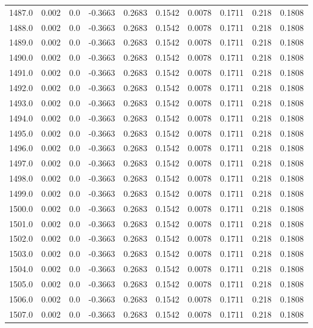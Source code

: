 \begin{longtable}{lrrrrrrrrr}
1487.0 & 0.002 & 0.0 & -0.3663 & 0.2683 & 0.1542 & 0.0078 & 0.1711 & 0.218 & 0.1808 \\
1488.0 & 0.002 & 0.0 & -0.3663 & 0.2683 & 0.1542 & 0.0078 & 0.1711 & 0.218 & 0.1808 \\
1489.0 & 0.002 & 0.0 & -0.3663 & 0.2683 & 0.1542 & 0.0078 & 0.1711 & 0.218 & 0.1808 \\
1490.0 & 0.002 & 0.0 & -0.3663 & 0.2683 & 0.1542 & 0.0078 & 0.1711 & 0.218 & 0.1808 \\
1491.0 & 0.002 & 0.0 & -0.3663 & 0.2683 & 0.1542 & 0.0078 & 0.1711 & 0.218 & 0.1808 \\
1492.0 & 0.002 & 0.0 & -0.3663 & 0.2683 & 0.1542 & 0.0078 & 0.1711 & 0.218 & 0.1808 \\
1493.0 & 0.002 & 0.0 & -0.3663 & 0.2683 & 0.1542 & 0.0078 & 0.1711 & 0.218 & 0.1808 \\
1494.0 & 0.002 & 0.0 & -0.3663 & 0.2683 & 0.1542 & 0.0078 & 0.1711 & 0.218 & 0.1808 \\
1495.0 & 0.002 & 0.0 & -0.3663 & 0.2683 & 0.1542 & 0.0078 & 0.1711 & 0.218 & 0.1808 \\
1496.0 & 0.002 & 0.0 & -0.3663 & 0.2683 & 0.1542 & 0.0078 & 0.1711 & 0.218 & 0.1808 \\
1497.0 & 0.002 & 0.0 & -0.3663 & 0.2683 & 0.1542 & 0.0078 & 0.1711 & 0.218 & 0.1808 \\
1498.0 & 0.002 & 0.0 & -0.3663 & 0.2683 & 0.1542 & 0.0078 & 0.1711 & 0.218 & 0.1808 \\
1499.0 & 0.002 & 0.0 & -0.3663 & 0.2683 & 0.1542 & 0.0078 & 0.1711 & 0.218 & 0.1808 \\
1500.0 & 0.002 & 0.0 & -0.3663 & 0.2683 & 0.1542 & 0.0078 & 0.1711 & 0.218 & 0.1808 \\
1501.0 & 0.002 & 0.0 & -0.3663 & 0.2683 & 0.1542 & 0.0078 & 0.1711 & 0.218 & 0.1808 \\
1502.0 & 0.002 & 0.0 & -0.3663 & 0.2683 & 0.1542 & 0.0078 & 0.1711 & 0.218 & 0.1808 \\
1503.0 & 0.002 & 0.0 & -0.3663 & 0.2683 & 0.1542 & 0.0078 & 0.1711 & 0.218 & 0.1808 \\
1504.0 & 0.002 & 0.0 & -0.3663 & 0.2683 & 0.1542 & 0.0078 & 0.1711 & 0.218 & 0.1808 \\
1505.0 & 0.002 & 0.0 & -0.3663 & 0.2683 & 0.1542 & 0.0078 & 0.1711 & 0.218 & 0.1808 \\
1506.0 & 0.002 & 0.0 & -0.3663 & 0.2683 & 0.1542 & 0.0078 & 0.1711 & 0.218 & 0.1808 \\
1507.0 & 0.002 & 0.0 & -0.3663 & 0.2683 & 0.1542 & 0.0078 & 0.1711 & 0.218 & 0.1808 \\

\end{longtable}
